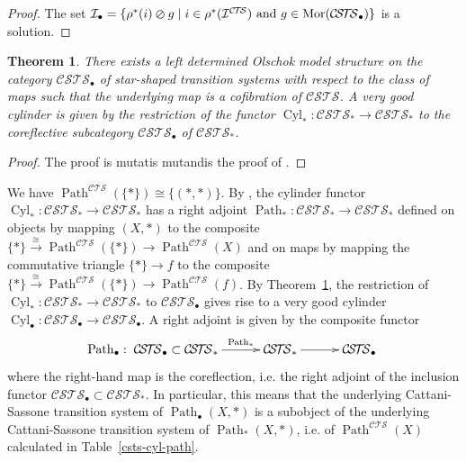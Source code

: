 \documentclass[a4paper,12pt]{amsart}
\newtheorem{thm}{Theorem}[section]
\begin{document}
\begin{proof} The set ${\mathcal{I}}_\bullet = \{\rho^*(i) \varoslash g \mid i \in
\rho^*({\mathcal{I}}^{\mathcal{C\!T\!S}}) \hbox{ and }g \in \operatorname{Mor}({\mathcal{C\!S\!T\!S}}_\bullet)\}$ is a
solution.  \end{proof}

\begin{thm} \label{star-shaped-csts} There exists a left determined Olschok
model structure on the category ${\mathcal{C\!S\!T\!S}}_{\bullet}$ of star-shaped
transition systems with respect to the class of maps such that the
underlying map is a cofibration of ${\mathcal{C\!S\!T\!S}}$.  A very good cylinder is
given by the restriction of the functor $\operatorname{{Cyl}}_*:{\mathcal{C\!S\!T\!S}}_* \to {\mathcal{C\!S\!T\!S}}_*$
to the coreflective subcategory ${\mathcal{C\!S\!T\!S}}_{\bullet}$ of ${\mathcal{C\!S\!T\!S}}_*$.  \end{thm}

\begin{proof} The proof is mutatis mutandis the proof of
\cite[Theorem~5.10]{biscsts1}.  \end{proof}

We have $\operatorname{{Path}}^{\mathcal{C\!T\!S}}(\{*\}) {\cong} \{(*,*)\}$.  By
\cite[Lemma~5.2]{leftdet}, the cylinder functor
$\operatorname{{Cyl}}_*:{\mathcal{C\!S\!T\!S}}_* \to {\mathcal{C\!S\!T\!S}}_*$ has a right adjoint
$\operatorname{{Path}}_*:{\mathcal{C\!S\!T\!S}}_* \to {\mathcal{C\!S\!T\!S}}_*$ defined on objects by mapping
$(X,*)$ to the composite $\{*\}\stackrel{\cong}\to
\operatorname{{Path}}^{\mathcal{C\!T\!S}}(\{*\})\to \operatorname{{Path}}^{\mathcal{C\!T\!S}}(X)$ and on maps by mapping the
commutative triangle $\{*\}\to f$ to the composite
$\{*\}\stackrel{\cong}\to \operatorname{{Path}}^{\mathcal{C\!T\!S}}(\{*\})\to \operatorname{{Path}}^{\mathcal{C\!T\!S}}(f)$.  By
Theorem~\ref{star-shaped-csts}, the restriction of
$\operatorname{{Cyl}}_*:{\mathcal{C\!S\!T\!S}}_* \to {\mathcal{C\!S\!T\!S}}_*$ to ${\mathcal{C\!S\!T\!S}}_{\bullet}$
gives rise to a very good cylinder $\operatorname{{Cyl}}_\bullet:{\mathcal{C\!S\!T\!S}}_\bullet
\to {\mathcal{C\!S\!T\!S}}_\bullet$. A right adjoint is given by the composite functor
\[\operatorname{{Path}}_\bullet: \xymatrix@C=3em{{\mathcal{C\!S\!T\!S}}_\bullet \subset {\mathcal{C\!S\!T\!S}}_*
  {\ar@{->}[r]^-{{\operatorname{{Path}}_*}}} & {\mathcal{C\!S\!T\!S}}_* {\ar@{->}[r]^-{{}}} & {\mathcal{C\!S\!T\!S}}_{\bullet}}\] where the
right-hand map is the coreflection, i.e. the right adjoint of the
inclusion functor ${\mathcal{C\!S\!T\!S}}_{\bullet} \subset {\mathcal{C\!S\!T\!S}}_*$. In particular,
this means that the underlying Cattani-Sassone transition system of
$\operatorname{{Path}}_\bullet(X,*)$ is a subobject of the underlying Cattani-Sassone
transition system of $\operatorname{{Path}}_*(X,*)$, i.e. of $\operatorname{{Path}}^{\mathcal{C\!T\!S}}(X)$
calculated in Table~\ref{csts-cyl-path}.
\end{document}
